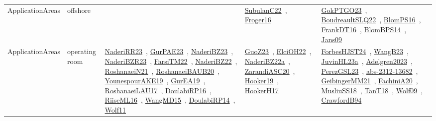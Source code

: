 {\begin{longtable}{lp{3cm}>{\raggedright\arraybackslash}p{6cm}>{\raggedright\arraybackslash}p{6cm}>{\raggedright\arraybackslash}p{8cm}}
ApplicationAreas & offshore &  & \href{../works/SubulanC22.pdf}{SubulanC22}~\cite{SubulanC22}, \href{../works/Froger16.pdf}{Froger16}~\cite{Froger16} & \href{../works/GokPTGO23.pdf}{GokPTGO23}~\cite{GokPTGO23}, \href{../works/BoudreaultSLQ22.pdf}{BoudreaultSLQ22}~\cite{BoudreaultSLQ22}, \href{../works/BlomPS16.pdf}{BlomPS16}~\cite{BlomPS16}, \href{../works/FrankDT16.pdf}{FrankDT16}~\cite{FrankDT16}, \href{../works/BlomBPS14.pdf}{BlomBPS14}~\cite{BlomBPS14}, \href{../works/Jans09.pdf}{Jans09}~\cite{Jans09}\\
ApplicationAreas & operating room & \href{../works/NaderiRR23.pdf}{NaderiRR23}~\cite{NaderiRR23}, \href{../works/GurPAE23.pdf}{GurPAE23}~\cite{GurPAE23}, \href{../works/NaderiBZ23.pdf}{NaderiBZ23}~\cite{NaderiBZ23}, \href{../works/NaderiBZR23.pdf}{NaderiBZR23}~\cite{NaderiBZR23}, \href{../works/FarsiTM22.pdf}{FarsiTM22}~\cite{FarsiTM22}, \href{../works/NaderiBZ22.pdf}{NaderiBZ22}~\cite{NaderiBZ22}, \href{../works/RoshanaeiN21.pdf}{RoshanaeiN21}~\cite{RoshanaeiN21}, \href{../works/RoshanaeiBAUB20.pdf}{RoshanaeiBAUB20}~\cite{RoshanaeiBAUB20}, \href{../works/YounespourAKE19.pdf}{YounespourAKE19}~\cite{YounespourAKE19}, \href{../works/GurEA19.pdf}{GurEA19}~\cite{GurEA19}, \href{../works/RoshanaeiLAU17.pdf}{RoshanaeiLAU17}~\cite{RoshanaeiLAU17}, \href{../works/DoulabiRP16.pdf}{DoulabiRP16}~\cite{DoulabiRP16}, \href{../works/RiiseML16.pdf}{RiiseML16}~\cite{RiiseML16}, \href{../works/WangMD15.pdf}{WangMD15}~\cite{WangMD15}, \href{../works/DoulabiRP14.pdf}{DoulabiRP14}~\cite{DoulabiRP14}, \href{../works/Wolf11.pdf}{Wolf11}~\cite{Wolf11} & \href{../works/GuoZ23.pdf}{GuoZ23}~\cite{GuoZ23}, \href{../works/ElciOH22.pdf}{ElciOH22}~\cite{ElciOH22}, \href{../works/NaderiBZ22a.pdf}{NaderiBZ22a}~\cite{NaderiBZ22a}, \href{../works/ZarandiASC20.pdf}{ZarandiASC20}~\cite{ZarandiASC20}, \href{../works/Hooker19.pdf}{Hooker19}~\cite{Hooker19}, \href{../works/HookerH17.pdf}{HookerH17}~\cite{HookerH17} & \href{../works/ForbesHJST24.pdf}{ForbesHJST24}~\cite{ForbesHJST24}, \href{../works/WangB23.pdf}{WangB23}~\cite{WangB23}, \href{../works/JuvinHL23a.pdf}{JuvinHL23a}~\cite{JuvinHL23a}, \href{../works/Adelgren2023.pdf}{Adelgren2023}~\cite{Adelgren2023}, \href{../works/PerezGSL23.pdf}{PerezGSL23}~\cite{PerezGSL23}, \href{../works/abs-2312-13682.pdf}{abs-2312-13682}~\cite{abs-2312-13682}, \href{../works/GeibingerMM21.pdf}{GeibingerMM21}~\cite{GeibingerMM21}, \href{../works/FachiniA20.pdf}{FachiniA20}~\cite{FachiniA20}, \href{../works/MusliuSS18.pdf}{MusliuSS18}~\cite{MusliuSS18}, \href{../works/TanT18.pdf}{TanT18}~\cite{TanT18}, \href{../works/Wolf09.pdf}{Wolf09}~\cite{Wolf09}, \href{../works/CrawfordB94.pdf}{CrawfordB94}~\cite{CrawfordB94}\\

\end{longtable}}
